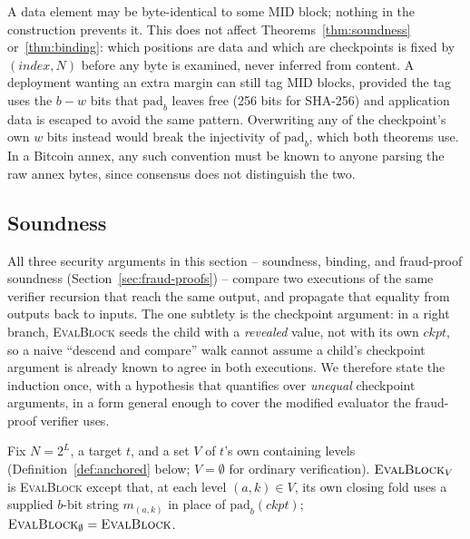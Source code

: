 \begin{remark}
\label{rem:domain-sep-bit}
A data element may be byte-identical to some $\mathrm{MID}$ block; nothing
in the construction prevents it. This does not affect
Theorems~\ref{thm:soundness} or~\ref{thm:binding}: which positions are
data and which are checkpoints is fixed by $(\mathit{index}, N)$ before any
byte is examined, never inferred from content. A deployment wanting an
extra margin can still tag $\mathrm{MID}$ blocks, provided the tag uses
the $b-w$ bits that $\mathrm{pad}_b$ leaves free (256 bits for SHA-256)
and application data is escaped to avoid the same pattern. Overwriting any
of the checkpoint's own $w$ bits instead would break the injectivity of
$\mathrm{pad}_b$, which both theorems use. In a Bitcoin annex, any such
convention must be known to anyone parsing the raw annex bytes, since
consensus does not distinguish the two.
\end{remark}

\subsection{Soundness}

All three security arguments in this section -- soundness, binding, and
fraud-proof soundness (Section~\ref{sec:fraud-proofs}) -- compare two
executions of the same verifier recursion that reach the same output, and
propagate that equality from outputs back to inputs. The one subtlety is
the checkpoint argument: in a right branch, \textsc{EvalBlock} seeds the
child with a \emph{revealed} value, not with its own $\mathit{ckpt}$, so a
naive ``descend and compare'' walk cannot assume a child's checkpoint
argument is already known to agree in both executions. We therefore state
the induction once, with a hypothesis that quantifies over
\emph{unequal} checkpoint arguments, in a form general enough to cover the
modified evaluator the fraud-proof verifier uses.

Fix $N = 2^L$, a target $t$, and a set $V$ of $t$'s own containing levels
(Definition~\ref{def:anchored} below; $V = \emptyset$ for ordinary
verification). $\textsc{EvalBlock}_V$ is \textsc{EvalBlock} except that, at
each level $(a,k) \in V$, its own closing fold uses a supplied $b$-bit
string $m_{(a,k)}$ in place of $\mathrm{pad}_b(\mathit{ckpt})$;
$\textsc{EvalBlock}_\emptyset = \textsc{EvalBlock}$.


